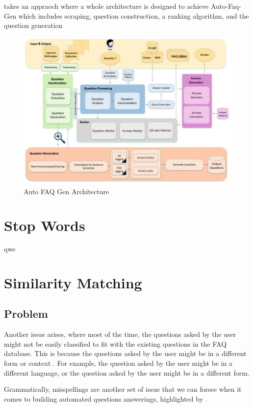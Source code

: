 \cite{10.1007/978-3-319-18356-5_30} takes an appraoch where a whole architecture is designed to achieve Auto-Faq-Gen which includes scraping, question construction, a ranking algorithm, and the question generation

\begin{figure}[H]
  \noindent \includegraphics[scale=0.87]{assets/auto-faq-gen-architecture.png}
\caption{Auto FAQ Gen Architecture}\label{auto-faq-gen-arch}
\end{figure}

\pagebreak 
\section{Stop Words}
qwe

\pagebreak
\section{Similarity Matching}
\subsection*{Problem}
Another issue arises, where most of the time, the questions asked by the user might not be easily classified to fit with the existing questions in the FAQ database. This is because the questions asked by the user might be in a different form or context \cite{10.1007/978-3-319-42911-3_25}. For example, the question asked by the user might be in a different language, or the question asked by the user might be in a different form. 

Grammatically, misspellings are another set of issue that we can forsee when it comes to building automated questions answerings, highlighted by \cite{sms_faq_retrieval}.

